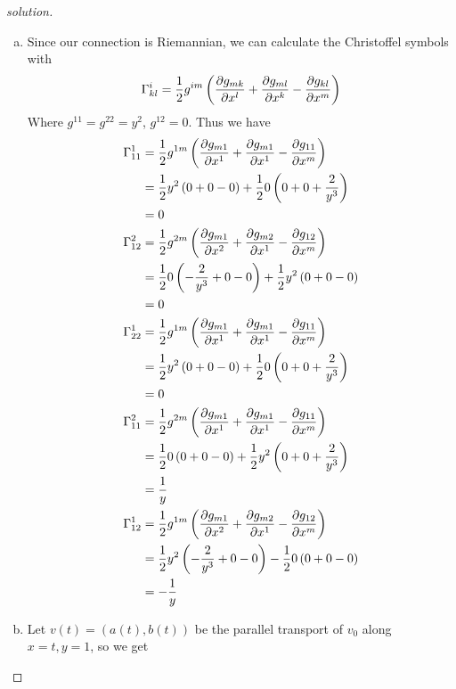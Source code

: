 \documentclass[a4paper]{article}
\begin{document}
\begin{proof}[solution]
  \begin{enumerate}[(a)]
    \item Since our connection is Riemannian, we can calculate the Christoffel symbols with
  \[
    \Gamma_{kl}^i = \frac{1}{2} g^{im} \left( \pdv{g_{mk}}{x^l} + \pdv{g_{ml}}{x^k} - \pdv{g_{kl}}{x^m} \right)
  \]
  Where $g^{11} = g^{22} = y^2$, $g^{12} = 0$. Thus we have
  \[
    \begin{aligned}
      \Gamma_{11}^1 &= \frac{1}{2} g^{1m} \left( \pdv{g_{m1}}{x^1} + \pdv{g_{m1}}{x^1} - \pdv{g_{11}}{x^m} \right) \\
                    &= \frac{1}{2} y^2 \left(0 + 0 - 0 \right) + \frac{1}{2} 0\left(0 + 0 + \frac{2}{y^3}  \right) \\
                    &= 0 \\
      \Gamma_{12}^2 &= \frac{1}{2} g^{2m} \left( \pdv{g_{m1}}{x^2} + \pdv{g_{m2}}{x^1} - \pdv{g_{12}}{x^m} \right) \\
                    &= \frac{1}{2} 0 \left(-\frac{2}{y^3} + 0 - 0\right) + \frac{1}{2}y^2 \left(0 + 0 - 0 \right) \\ 
                    &= 0 \\
      \Gamma_{22}^1 &= \frac{1}{2} g^{1m} \left( \pdv{g_{m1}}{x^1} + \pdv{g_{m1}}{x^1} - \pdv{g_{11}}{x^m} \right) \\
                    &= \frac{1}{2} y^2 \left(0 + 0 - 0\right) + \frac{1}{2} 0 \left(0 + 0 + \frac{2}{y^3} \right) \\
                    &= 0 \\
      \Gamma_{11}^2 &= \frac{1}{2} g^{2m} \left( \pdv{g_{m1}}{x^1} + \pdv{g_{m1}}{x^1} - \pdv{g_{11}}{x^m} \right) \\
                    &= \frac{1}{2} 0 \left( 0 + 0 - 0 \right) + \frac{1}{2} y^2 \left(0 + 0 + \frac{2}{y^3} \right) \\
                    &= \frac{1}{y} \\
      \Gamma_{12}^1 &= \frac{1}{2} g^{1m} \left( \pdv{g_{m1}}{x^2} + \pdv{g_{m2}}{x^1} - \pdv{g_{12}}{x^m} \right) \\
                    &= \frac{1}{2}  y^2 \left( -\frac{2}{y^3} + 0 - 0 \right) - \frac{1}{2} 0 \left( 0 + 0 - 0 \right) \\
                    &= -\frac{1}{y}
    \end{aligned}
  \]
\item Let $v(t) = (a(t), b(t))$ be the parallel transport of $v_0$ along $x = t, y = 1$, so we get

\end{enumerate}
\end{proof}
\end{document}

